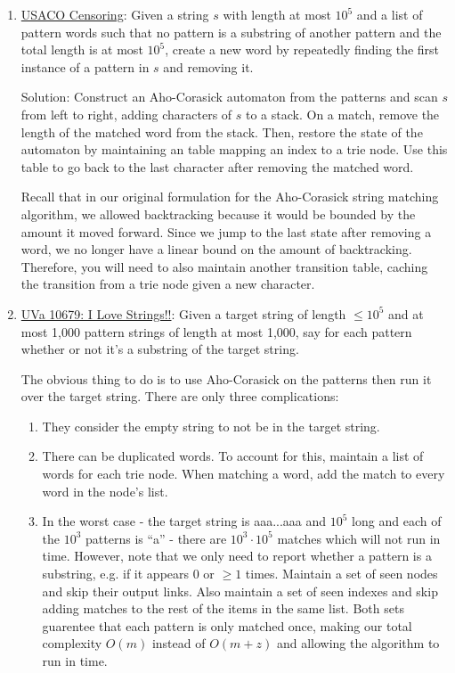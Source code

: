 \documentclass[11pt, oneside]{article}
\begin{document}
\begin{enumerate}
  \item \href{http://www.usaco.org/index.php?page=viewproblem2&cpid=533}{USACO Censoring}:
  Given a string \( s \) with length at most \( 10^5 \) and a list of pattern words such that no pattern
  is a substring of another pattern and the total length is at most \( 10^5 \), create a new word
  by repeatedly finding the first instance of a pattern in \( s \) and removing it.

  Solution: Construct an Aho-Corasick automaton from the patterns and scan \( s \) from left to right, adding
  characters of \( s \) to a stack. On a match, remove the length of the matched word from the stack.
  Then, restore the state of the automaton by maintaining an table mapping an index to a trie node.
  Use this table to go back to the last character after removing the matched word.

  Recall that in our original formulation for the Aho-Corasick string matching algorithm,
  we allowed backtracking because it would be bounded by the amount it moved forward.
  Since we jump to the last state after removing a word, we no longer have a linear bound
  on the amount of backtracking. Therefore, you will need to also maintain another transition table,
  caching the transition from a trie node given a new character.

  \item \href{https://onlinejudge.org/index.php?option=onlinejudge&page=show_problem&problem=1620}{UVa 10679: I Love Strings!!}:
  Given a target string of length \( \leq 10^5 \) and at most 1,000 pattern strings of length at most 1,000, say for each pattern
  whether or not it's a substring of the target string.

  The obvious thing to do is to use Aho-Corasick on the patterns then run it over the target string.
  There are only three complications:
  \begin{enumerate}
    \item They consider the empty string to not be in the target string.
    \item There can be duplicated words. To account for this, maintain a list of words for each trie node.
    When matching a word, add the match to every word in the node's list.
    \item In the worst case - the target string is aaa...aaa and \( 10^5 \) long and each of the \( 10^3 \) patterns is ``a'' -
    there are \( 10^3 \cdot 10^5 \) matches which will not run in time. However, note that we only need to report
    whether a pattern is a substring, e.g. if it appears 0 or \( \geq 1 \) times. Maintain a set of seen nodes and skip their output links.
    Also maintain a set of seen indexes and skip adding matches to the rest of the items in the same list.
    Both sets guarentee that each pattern is only matched once, making our total complexity  \( O(m) \) instead
    of \( O(m + z) \) and allowing the algorithm to run in time.
  \end{enumerate}


\end{enumerate}
\end{document}
